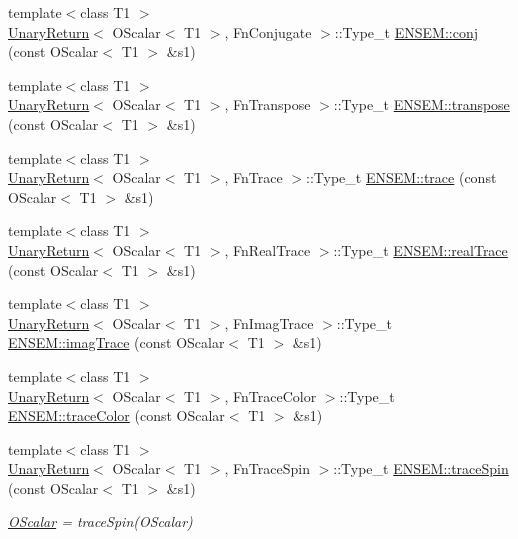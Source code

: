 \begin{DoxyCompactItemize}
\item 
{\footnotesize template$<$class T1 $>$ }\\\mbox{\hyperlink{structUnaryReturn}{Unary\+Return}}$<$ O\+Scalar$<$ T1 $>$, Fn\+Conjugate $>$\+::Type\+\_\+t \mbox{\hyperlink{group__obsscalar_gad6c32f4ab79b8017fc993162435d1d72}{E\+N\+S\+E\+M\+::conj}} (const O\+Scalar$<$ T1 $>$ \&s1)
\item 
{\footnotesize template$<$class T1 $>$ }\\\mbox{\hyperlink{structUnaryReturn}{Unary\+Return}}$<$ O\+Scalar$<$ T1 $>$, Fn\+Transpose $>$\+::Type\+\_\+t \mbox{\hyperlink{group__obsscalar_ga6af2d66b673bc2683558f88c9eac327e}{E\+N\+S\+E\+M\+::transpose}} (const O\+Scalar$<$ T1 $>$ \&s1)
\item 
{\footnotesize template$<$class T1 $>$ }\\\mbox{\hyperlink{structUnaryReturn}{Unary\+Return}}$<$ O\+Scalar$<$ T1 $>$, Fn\+Trace $>$\+::Type\+\_\+t \mbox{\hyperlink{group__obsscalar_ga86ed3e3adf57442824b4275e5ea2a3fd}{E\+N\+S\+E\+M\+::trace}} (const O\+Scalar$<$ T1 $>$ \&s1)
\item 
{\footnotesize template$<$class T1 $>$ }\\\mbox{\hyperlink{structUnaryReturn}{Unary\+Return}}$<$ O\+Scalar$<$ T1 $>$, Fn\+Real\+Trace $>$\+::Type\+\_\+t \mbox{\hyperlink{group__obsscalar_ga3314cb92fadaf86f0fa6dfe446ddc388}{E\+N\+S\+E\+M\+::real\+Trace}} (const O\+Scalar$<$ T1 $>$ \&s1)
\item 
{\footnotesize template$<$class T1 $>$ }\\\mbox{\hyperlink{structUnaryReturn}{Unary\+Return}}$<$ O\+Scalar$<$ T1 $>$, Fn\+Imag\+Trace $>$\+::Type\+\_\+t \mbox{\hyperlink{group__obsscalar_ga1dff0d4b73bbb026e6a9287ffd531523}{E\+N\+S\+E\+M\+::imag\+Trace}} (const O\+Scalar$<$ T1 $>$ \&s1)
\item 
{\footnotesize template$<$class T1 $>$ }\\\mbox{\hyperlink{structUnaryReturn}{Unary\+Return}}$<$ O\+Scalar$<$ T1 $>$, Fn\+Trace\+Color $>$\+::Type\+\_\+t \mbox{\hyperlink{group__obsscalar_ga6c49507babe850f36f0765318257dc08}{E\+N\+S\+E\+M\+::trace\+Color}} (const O\+Scalar$<$ T1 $>$ \&s1)
\item 
{\footnotesize template$<$class T1 $>$ }\\\mbox{\hyperlink{structUnaryReturn}{Unary\+Return}}$<$ O\+Scalar$<$ T1 $>$, Fn\+Trace\+Spin $>$\+::Type\+\_\+t \mbox{\hyperlink{group__obsscalar_gaec323bb3e795f6f48bd41e629e4c38ab}{E\+N\+S\+E\+M\+::trace\+Spin}} (const O\+Scalar$<$ T1 $>$ \&s1)
\begin{DoxyCompactList}\small\item\em \mbox{\hyperlink{classENSEM_1_1OScalar}{O\+Scalar}} = trace\+Spin(\+O\+Scalar) \end{DoxyCompactList}\item 

\end{DoxyCompactItemize}
